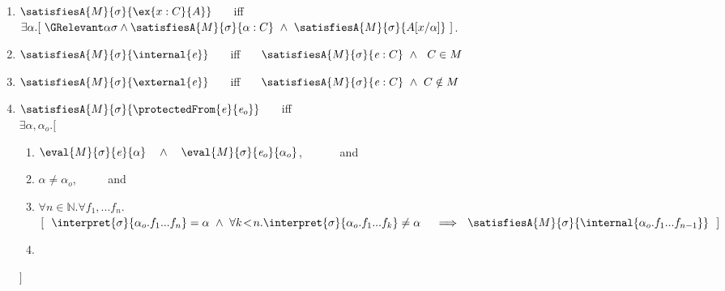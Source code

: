 \begin{enumerate}
\item
\label{quant2}
$\satisfiesA{M}{\sigma}{\ex{x:C}{A}}$ \ \ \ iff \ \ \  
 {$\exists \alpha.[\ \GRelevant \alpha \sigma \wedge  \satisfiesA {M}{\sigma} {\alpha:C}  \ \wedge \ \satisfiesA{M}{\sigma} {A[x/\alpha]}\ ]$.} 
\item
\label{cInternal}
$\satisfiesA{M}{\sigma}{\internal{{\re}}}$ \ \ \ iff \ \ \   $\satisfiesA{M}{\sigma}{{{\re}} : C} \ \wedge\ \ C \in M$
\item
\label{cExternal}
$\satisfiesA{M}{\sigma}{\external{{\re}}}$ \ \ \ iff \ \ \   $\satisfiesA{M}{\sigma}{{{\re}} : C} \ \wedge \ C \notin M$
\item
\label{cProtected}
$\satisfiesA{M}{\sigma}{\protectedFrom{{\re}} {{\re_{o}}}}$  \ \ \ iff \\
  \red{$\satisfiesA{M}{\sigma}{\internal \re_o}$ or \\}
  $\exists \alpha, \alpha_{o}. [\ $
\begin{enumerate}
\item $\eval{M}{\sigma}{{\re}}{\alpha} \ \ \ \wedge\ \ \  \eval{M}{\sigma}{{\re_{o}}}{\alpha_{o}}$, \ \ \ \ \ \ and  
\item
{$\alpha \neq \alpha_{o}$}, %
\ \  \ \ \  and 
\item 
{$\forall n\in\mathbb{N}. \forall f_1,...f_n.$\\
$
[\ \ \interpret{\sigma}{\alpha_{o}.f_1...f_n}=\alpha \ \wedge\ \forall k\!<\!n.\interpret{\sigma}{\alpha_{o}.f_1...f_k}\neq \alpha \ \
\ \  \Longrightarrow \ \ \satisfiesA{M} {\sigma} {\internal{{\alpha_{o}.f_1...f_{n-1}}}}\ \ ]$}
\item
{}
\end{enumerate}
\strut \hspace{.4cm} $]$

\end{enumerate}
